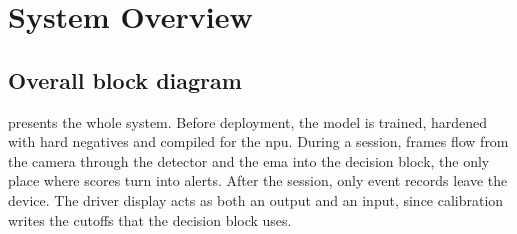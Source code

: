 \section{System Overview}
\subsection{Overall block diagram}

 presents the whole system. Before deployment, the model is trained, hardened with hard negatives and compiled for the \gls{npu}. During a session, frames flow from the camera through the detector and the \gls{ema} into the decision block, the only place where scores turn into alerts. After the session, only event records leave the device. The driver display acts as both an output and an input, since calibration writes the cutoffs that the decision block uses.


